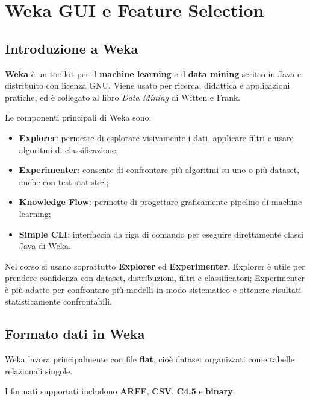 \chapter{Weka GUI e Feature Selection}

\section{Introduzione a Weka}

\textbf{Weka} è un toolkit per il \textbf{machine learning} e il \textbf{data mining} scritto in Java e distribuito con licenza GNU. Viene usato per ricerca, didattica e applicazioni pratiche, ed è collegato al libro \emph{Data Mining} di Witten e Frank.

Le componenti principali di Weka sono:

\begin{itemize}
    \item \textbf{Explorer}: permette di esplorare visivamente i dati, applicare filtri e usare algoritmi di classificazione;
    \item \textbf{Experimenter}: consente di confrontare più algoritmi su uno o più dataset, anche con test statistici;
    \item \textbf{Knowledge Flow}: permette di progettare graficamente pipeline di machine learning;
    \item \textbf{Simple CLI}: interfaccia da riga di comando per eseguire direttamente classi Java di Weka.
\end{itemize}

\begin{notaprof}
Nel corso si usano soprattutto \textbf{Explorer} ed \textbf{Experimenter}. Explorer è utile per prendere confidenza con dataset, distribuzioni, filtri e classificatori; Experimenter è più adatto per confrontare più modelli in modo sistematico e ottenere risultati statisticamente confrontabili.
\end{notaprof}

\section{Formato dati in Weka}

Weka lavora principalmente con file \textbf{flat}, cioè dataset organizzati come tabelle relazionali singole.

\begin{notaslide}
I formati supportati includono \textbf{ARFF}, \textbf{CSV}, \textbf{C4.5} e \textbf{binary}.
\end{notaslide}

